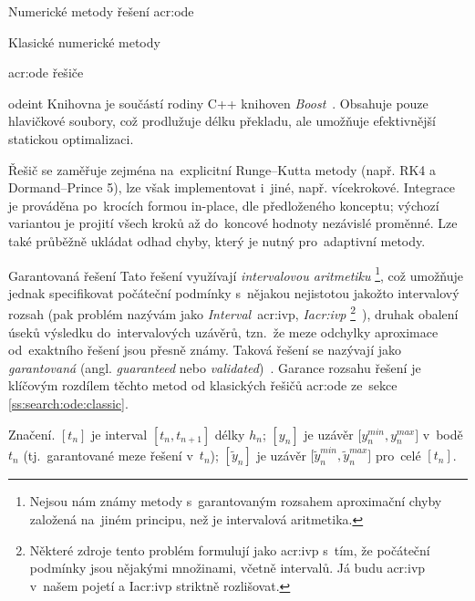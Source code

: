 \documentclass[thesis=M,czech]{FITthesis}[2012/06/26]
\newcommand{\acrlabel}[1]{acr:#1}
\newcommand{\acr}[1]{\acrshort{\acrlabel{#1}}}
\newcommand{\hl}[1]{\textit{#1}}
\newcommand{\name}[1]{\hl{#1}}
\newcommand{\cit}[1]{\cite{#1}}
\newcommand{\rf}[1]{\ref{#1}}
\newcommand{\pred}[1]{\ensuremath{\tilde{#1}}}
\begin{document}
\begin{section}{Numerické metody řešení \acr{ode}}
\begin{subsection}{Klasické numerické metody}
\begin{subsubsection}{\acr{ode} řešiče}
\begin{paragraph}{odeint}
Knihovna je součástí rodiny C++ knihoven \name{Boost}~\cit{boost-libs}.
Obsahuje pouze hlavičkové soubory,
což prodlužuje délku překladu,
ale umožňuje efektivnější statickou optimalizaci.

Řešič se zaměřuje zejména na~explicitní Runge--Kutta metody
(např. RK4 a Dormand--Prince 5),
lze však implementovat i~jiné, např. vícekrokové.
Integrace je prováděna po~krocích formou in-place,
dle předloženého konceptu;
výchozí variantou je projití všech kroků
až do~koncové hodnoty nezávislé proměnné.
Lze také průběžně ukládat odhad chyby,
který je nutný pro~adaptivní metody.
\end{paragraph} %


\end{subsubsection} %


\end{subsection} %


\begin{subsection}{Garantovaná řešení}\label{ss:search:ode:valid}
Tato řešení využívají \name{intervalovou aritmetiku}%
\footnote{Nejsou nám známy metody s~garantovaným rozsahem aproximační chyby
založená na~jiném principu, než je intervalová aritmetika.},
což umožňuje jednak specifikovat počáteční podmínky
s~nějakou nejistotou jakožto intervalový rozsah
(pak problém nazývám jako \name{Interval}~\acr{ivp},
\name{I\acr{ivp}}%
\footnote{Některé zdroje tento problém formulují
jako \acr{ivp} s~tím, že počáteční podmínky
jsou nějakými množinami, včetně intervalů.
Já budu \acr{ivp} v~našem pojetí a I\acr{ivp}
striktně rozlišovat.}~\cit{ode-valid-runge_kutta-art}),
druhak obalení úseků výsledku do~intervalových uzávěrů,
tzn.~že meze odchylky aproximace od~exaktního řešení
jsou přesně známy.
Taková řešení se nazývají jako \name{garantovaná}
(angl. \name{guaranteed}
nebo \name{validated})~\cit{ode-valid-runge_kutta-art}.
Garance rozsahu řešení je klíčovým rozdílem
těchto metod
od klasických řešičů \acr{ode}
ze~sekce \rf{ss:search:ode:classic}.


\begin{paragraph}{Značení.}\label{p:search:ode:valid:sign}
${[t_n]}$ je interval ${[t_{n}, t_{n+1}]}$ délky $h_n$;
${[y_n]}$ je uzávěr ${[y^{min}_{n}, y^{max}_{n}}]$ v~bodě $t_n$
(tj.~garantované meze řešení v~$t_n$);
${[\pred{y}_n]}$ je uzávěr ${[\pred{y}^{min}_{n}, \pred{y}^{max}_{n}}]$
pro~celé ${[t_n]}$.
\end{paragraph} %


\end{subsection}
\end{section}
\end{document}
